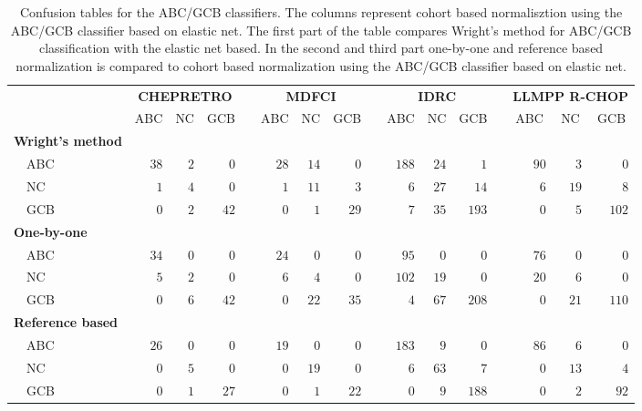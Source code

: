 \begin{table}[!tbp]
\begin{adjustwidth}{-1in}{0in}
{\footnotesize
\caption{Confusion tables for the ABC/GCB classifiers.
The columns represent cohort based normalisztion using the ABC/GCB classifier
based on elastic net.
The first part of the table compares Wright's method for ABC/GCB classification
with the elastic net based.
In the second and third part one-by-one and reference based normalization is
compared to cohort based normalization using the ABC/GCB classifier based on
elastic net.\label{tab:confusionABCGCBHEMA}} 
\begin{center}
\begin{tabular}{lrrrcrrrcrrrcrrr}
\hline\hline
\multicolumn{1}{l}{\bfseries }&\multicolumn{3}{c}{\bfseries CHEPRETRO}&\multicolumn{1}{c}{\bfseries }&\multicolumn{3}{c}{\bfseries MDFCI}&\multicolumn{1}{c}{\bfseries }&\multicolumn{3}{c}{\bfseries IDRC}&\multicolumn{1}{c}{\bfseries }&\multicolumn{3}{c}{\bfseries LLMPP R-CHOP}\tabularnewline
\cline{2-4} \cline{6-8} \cline{10-12} \cline{14-16}
\multicolumn{1}{l}{}&\multicolumn{1}{c}{ABC}&\multicolumn{1}{c}{NC}&\multicolumn{1}{c}{GCB}&\multicolumn{1}{c}{}&\multicolumn{1}{c}{ABC}&\multicolumn{1}{c}{NC}&\multicolumn{1}{c}{GCB}&\multicolumn{1}{c}{}&\multicolumn{1}{c}{ABC}&\multicolumn{1}{c}{NC}&\multicolumn{1}{c}{GCB}&\multicolumn{1}{c}{}&\multicolumn{1}{c}{ABC}&\multicolumn{1}{c}{NC}&\multicolumn{1}{c}{GCB}\tabularnewline
\hline
{\bfseries Wright's method}&&&&&&&&&&&&&&&\tabularnewline
~~ABC&$38$&$2$&$ 0$&&$28$&$14$&$ 0$&&$188$&$24$&$  1$&&$90$&$ 3$&$  0$\tabularnewline
~~NC&$ 1$&$4$&$ 0$&&$ 1$&$11$&$ 3$&&$  6$&$27$&$ 14$&&$ 6$&$19$&$  8$\tabularnewline
~~GCB&$ 0$&$2$&$42$&&$ 0$&$ 1$&$29$&&$  7$&$35$&$193$&&$ 0$&$ 5$&$102$\tabularnewline
\hline
{\bfseries One-by-one}&&&&&&&&&&&&&&&\tabularnewline
~~ABC&$34$&$0$&$ 0$&&$24$&$ 0$&$ 0$&&$ 95$&$ 0$&$  0$&&$76$&$ 0$&$  0$\tabularnewline
~~NC&$ 5$&$2$&$ 0$&&$ 6$&$ 4$&$ 0$&&$102$&$19$&$  0$&&$20$&$ 6$&$  0$\tabularnewline
~~GCB&$ 0$&$6$&$42$&&$ 0$&$22$&$35$&&$  4$&$67$&$208$&&$ 0$&$21$&$110$\tabularnewline
\hline
{\bfseries Reference based}&&&&&&&&&&&&&&&\tabularnewline
~~ABC&$26$&$0$&$ 0$&&$19$&$ 0$&$ 0$&&$183$&$ 9$&$  0$&&$86$&$ 6$&$  0$\tabularnewline
~~NC&$ 0$&$5$&$ 0$&&$ 0$&$19$&$ 0$&&$  6$&$63$&$  7$&&$ 0$&$13$&$  4$\tabularnewline
~~GCB&$ 0$&$1$&$27$&&$ 0$&$ 1$&$22$&&$  0$&$ 9$&$188$&&$ 0$&$ 2$&$ 92$\tabularnewline
\hline
\end{tabular}\end{center}}
\end{adjustwidth}
\end{table}
